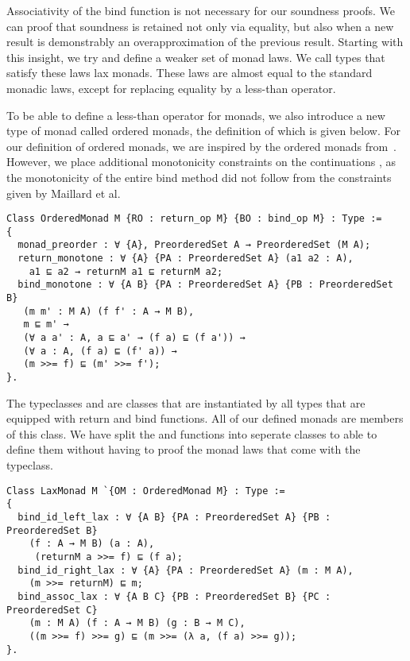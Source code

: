 Associativity of the bind function is not necessary for our soundness proofs.
We can proof that soundness is retained not only via equality, but also when a
new result is demonstrably an overapproximation of the previous result.
Starting with this insight, we try and define a weaker set of monad laws. We
call types that satisfy these laws lax monads. These laws are almost equal to
the standard monadic laws, except for replacing equality by a less-than
operator.

To be able to define a less-than operator for monads, we also introduce a new
type of monad called ordered monads, the definition of which is given below.
For our definition of ordered monads, we are inspired by the ordered monads
from~\cite{maillard2019dijkstra}. However, we place additional monotonicity 
constraints on the continuations , as the monotonicity of the entire
bind method did not follow from the constraints given by Maillard et al.

\begin{verbatim}
Class OrderedMonad M {RO : return_op M} {BO : bind_op M} : Type :=
{
  monad_preorder : ∀ {A}, PreorderedSet A → PreorderedSet (M A);
  return_monotone : ∀ {A} {PA : PreorderedSet A} (a1 a2 : A),
    a1 ⊑ a2 → returnM a1 ⊑ returnM a2;
  bind_monotone : ∀ {A B} {PA : PreorderedSet A} {PB : PreorderedSet B} 
   (m m' : M A) (f f' : A → M B),
   m ⊑ m' → 
   (∀ a a' : A, a ⊑ a' → (f a) ⊑ (f a')) → 
   (∀ a : A, (f a) ⊑ (f' a)) →
   (m >>= f) ⊑ (m' >>= f');
}.
\end{verbatim}

The typeclasses  and  are classes that are
instantiated by all types that are equipped with return and bind functions. All
of our defined monads are members of this class. We have split the  and  functions into seperate classes to able to define them
without having to proof the monad laws that come with the 
typeclass.

\begin{verbatim}
Class LaxMonad M `{OM : OrderedMonad M} : Type :=
{
  bind_id_left_lax : ∀ {A B} {PA : PreorderedSet A} {PB : PreorderedSet B}
    (f : A → M B) (a : A),
     (returnM a >>= f) ⊑ (f a);
  bind_id_right_lax : ∀ {A} {PA : PreorderedSet A} (m : M A),
    (m >>= returnM) ⊑ m;
  bind_assoc_lax : ∀ {A B C} {PB : PreorderedSet B} {PC : PreorderedSet C}
    (m : M A) (f : A → M B) (g : B → M C),
    ((m >>= f) >>= g) ⊑ (m >>= (λ a, (f a) >>= g));
}.
\end{verbatim}
